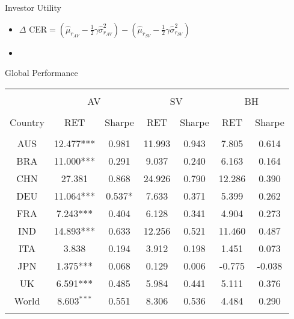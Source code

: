 \documentclass{beamer}
\begin{document}
\begin{frame}{Investor Utility}
\begin{itemize}[<+->]
	\item $\Delta \text{ CER} = \left(\hat \mu_{r_{AV}} - \frac{1}{2}\gamma\hat \sigma^{2}_{r_{AV}}\right) - \left(\hat \mu_{r_{SV}} - \frac{1}{2}\gamma\hat \sigma^{2}_{r_{SV}}\right)$
	\item[] 	\begin{figure}
		\resizebox{10cm}{5cm}{}
	\end{figure}
\end{itemize}

\end{frame}

\begin{frame}{Global Performance}
	\begin{adjustbox}{width=\textwidth}
		\begin{tabular}{@{\extracolsep{5pt}} ccccccc} 
			\\[-1.8ex]\hline 
			\hline \\[-1.8ex]
			& \multicolumn{2}{c}{AV} &\multicolumn{2}{c}{SV}& \multicolumn{2}{c}{BH}\\
			\cline{2-3} \cline{4-5} \cline{6-7}\\
			Country & RET & Sharpe & RET & Sharpe & RET & Sharpe \\ 
			\hline \\[-1.8ex] 
			AUS & 12.477*** & 0.981 & 11.993 & 0.943 & 7.805 & 0.614 \\ 
			BRA & 11.000*** & 0.291 & 9.037 & 0.240 & 6.163 & 0.164 \\ 
			CHN & 27.381 & 0.868 & 24.926 & 0.790 & 12.286 & 0.390 \\ 
			DEU & 11.064*** & 0.537* & 7.633 & 0.371 & 5.399 & 0.262 \\ 
			FRA & 7.243*** & 0.404 & 6.128 & 0.341 & 4.904 & 0.273 \\ 
			IND & 14.893*** & 0.633 & 12.256 & 0.521 & 11.460 & 0.487 \\ 
			ITA & 3.838 & 0.194 & 3.912 & 0.198 & 1.451 & 0.073 \\ 
			JPN & 1.375*** & 0.068 & 0.129 & 0.006 & -0.775 & -0.038 \\ 
			UK & 6.591*** & 0.485 & 5.984 & 0.441 & 5.111 & 0.376 \\ 
			World & 8.603$^{***}$ & 0.551 &  8.306 & 0.536  & 4.484 & 0.290\\
			\hline \\[-1.8ex] 
		\end{tabular} 
	\end{adjustbox}
	\end{frame}
\end{document}
